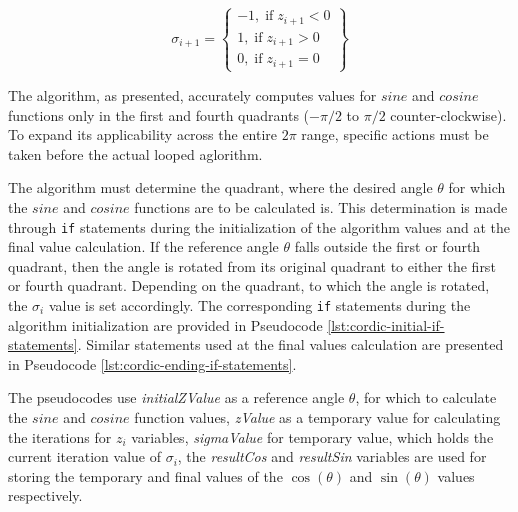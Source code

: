 \documentclass[a4paper, twoside, 11pt]{article}
\begin{document}
            \begin{equation}
                \sigma_{i+1} = 
                \left\{
                \begin{array}{lr}
                    -1,\;\text{if}\;z_{i+1} < 0\\
                    1,\;\text{if}\;z_{i+1} > 0\\
                    0,\;\text{if}\;z_{i+1} = 0
                \end{array}
                \right\}
            \end{equation}
            \par
            The algorithm, as presented, accurately computes values for $sine$ and $cosine$ functions only in the first and fourth quadrants ($-\pi/2$ to $\pi/2$ counter-clockwise). To expand its applicability across the entire $2\pi$ range, specific actions must be taken before the actual looped aglorithm.\par
            The algorithm must determine the quadrant, where the desired angle $\theta$ for which the $sine$ and $cosine$ functions are to be calculated is. This determination is made through \texttt{if} statements during the initialization of the algorithm values and at the final value calculation. If the reference angle $\theta$ falls outside the first or fourth quadrant, then the angle is rotated from its original quadrant to either the first or fourth quadrant. Depending on the quadrant, to which the angle is rotated, the $\sigma_i$ value is set accordingly. The corresponding \texttt{if} statements during the algorithm initialization are provided in Pseudocode \ref{lst:cordic-initial-if-statements}. Similar statements used at the final values calculation are presented in Pseudocode \ref{lst:cordic-ending-if-statements}.\par
            The pseudocodes use \textit{initialZValue} as a reference angle $\theta$, for which to calculate the $sine$ and $cosine$ function values, \textit{zValue} as a temporary value for calculating the iterations for $z_{i}$ variables, \textit{sigmaValue} for temporary value, which holds the current iteration value of $\sigma_i$, the \textit{resultCos} and \textit{resultSin} variables are used for storing the temporary and final values of the $\cos (\theta)$ and $\sin (\theta)$ values respectively.
\end{document}
